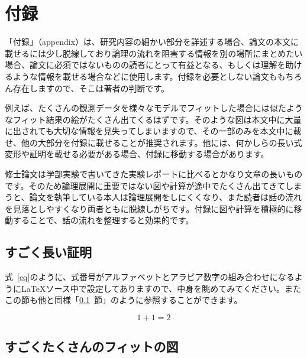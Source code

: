 \chapter*{付録} %

「付録」（appendix）は、研究内容の細かい部分を詳述する場合、論文の本文に載せるには少し脱線しており論理の流れを阻害する情報を別の場所にまとめたい場合、論文に必須ではないものの読者にとって有益となる、もしくは理解を助けるような情報を載せる場合などに使用します。付録を必要としない論文ももちろん存在しますので、そこは著者の判断です。

例えば、たくさんの観測データを様々なモデルでフィットした場合には似たようなフィット結果の絵がたくさん出てくるはずです。そのような図は本文中に大量に出されても大切な情報を見失ってしまいますので、その一部のみを本文中に載せ、他の大部分を付録に載せることが推奨されます。他には、何かしらの長い式変形や証明を載せる必要がある場合、付録に移動する場合があります。

修士論文は学部実験で書いてきた実験レポートに比べるとかなり文章の長いものです。そのため論理展開に重要ではない図や計算が途中でたくさん出てきてしまうと、論文を執筆している本人は論理展開をしにくくなり、また読者は話の流れを見落としやすくなり両者ともに脱線しがちです。付録に図や計算を積極的に移動することで、話の流れを整理すると効果的です。

\setcounter{section}{0} %
\renewcommand{\thesection}{\Alph{section}} %
\setcounter{equation}{0} %
\renewcommand{\theequation}{\Alph{section}.\arabic{equation}}
\setcounter{figure}{0} %
\renewcommand{\thefigure}{\Alph{section}.\arabic{figure}}
\setcounter{table}{0} %
\renewcommand{\thetable}{\Alph{section}.\arabic{table}}

\section{すごく長い証明}
\label{sec:very_long_proof}
式~\eqref{eq}のように、式番号がアルファベットとアラビア数字の組み合わせになるように\LaTeX{}ソース中で設定してありますので、中身を眺めてみてください。またこの節も他と同様「\ref{sec:very_long_proof}~節」のように参照することができます。

\begin{equation}
  \label{eq}
  1 + 1 = 2
\end{equation}

\section{すごくたくさんのフィットの図}
